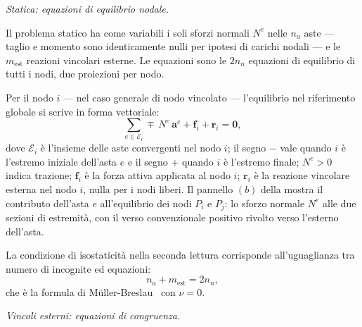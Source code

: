 




\medskip
\noindent\textit{Statica: equazioni di equilibrio nodale.}
\label{subsec:equilibrio_nodale}

Il problema statico ha come variabili i soli sforzi
normali $N^e$ nelle $n_a$ aste --- taglio e momento
sono identicamente nulli per ipotesi di carichi nodali
--- e le $m_\text{est}$ reazioni vincolari esterne.
Le equazioni sono le $2n_n$ equazioni di equilibrio
di tutti i nodi, due proiezioni per nodo.

Per il nodo $i$ --- nel caso generale di nodo vincolato ---
l'equilibrio nel riferimento globale si scrive in forma
vettoriale:
\begin{equation}\label{eq:equilibrio_nodale}
	\sum_{e \in \mathcal{E}_i}
	\mp\, N^e\, \mathbf{a}^e
	+ \mathbf{f}_i + \mathbf{r}_i = \bm{0},
\end{equation}
dove $\mathcal{E}_i$ è l'insieme delle aste convergenti
nel nodo $i$; il segno $-$ vale quando $i$ è l'estremo
iniziale dell'asta $e$ e il segno $+$ quando $i$ è
l'estremo finale; $N^e > 0$ indica trazione;
$\mathbf{f}_i$ è la forza
attiva applicata al nodo $i$; $\mathbf{r}_i $ è la reazione vincolare
esterna nel nodo $i$, nulla per i nodi liberi. 
Il pannello $(b)$ della 
mostra il contributo dell'asta $e$ all'equilibrio dei
nodi $P_i$ e $P_j$: lo sforzo normale $N^e$ alle due
sezioni di estremità, con il verso convenzionale positivo
rivolto verso l'esterno dell'asta.

La condizione di isostaticità nella seconda lettura
corrisponde all'uguaglianza tra numero di incognite
ed equazioni:
\[
n_a + m_\text{est} = 2n_n,
\]
che è la formula di M\"{u}ller-Breslau~
con $\nu = 0$.

\medskip
\noindent\textit{Vincoli esterni: equazioni di congruenza.}
\label{subsec:vincoli_esterni}

